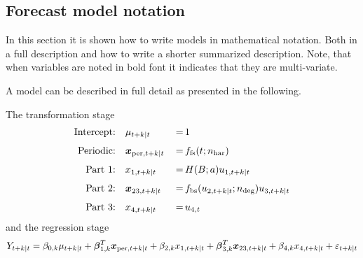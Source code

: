 \begin{appendix}


\section{Forecast model notation}\label{sec:forec-model-notat}
In this section it is shown how to write \onlineforecast models in mathematical
notation. Both in a full description and how to write a shorter summarized
description. Note, that when variables are noted in bold font it indicates that
they are multi-variate.

A model can be described in full detail as presented in the following.

The transformation stage
\begin{alignat}{2}\label{eq:model-full-trans}
  \text{Intercept:}\quad& \mu_{t+k|t} &\,=\,& 1 \\[1ex]
  \text{Periodic:}\quad& \mbox{\boldmath{$x$}}_{\mathrm{per},t+k|t} &\,=\,&  f_{\mathrm{fs}}(t;n_{\mathrm{har}}) \\[1ex]
  \text{Part 1:}\quad& x_{\mathrm{1},t+k|t} &\,=\,& H(B;a) u_{\mathrm{1},t+k|t} \\[1ex]
  \text{Part 2:}\quad& \mbox{\boldmath{$x$}}_{\mathrm{23},t+k|t} &\,=\,&
  f_{\mathrm{bs}}(u_{\mathrm{2},t+k|t};n_{\mathrm{deg}}) u_{\mathrm{3},t+k|t} \\[1ex]
  \text{Part 3:}\quad& x_{\mathrm{4},t+k|t} &\,=\,& u_{\mathrm{4},t}
\end{alignat}
and the regression stage
\begin{align}\label{eq:model-full-reg}
  Y_{t+k|t} = \beta_{0,k} \mu_{t+k|t} + \mbox{\boldmath{$\beta$}}^T_{1,k}
  \mbox{\boldmath{$x$}}_{\mathrm{per},t+k|t} + \beta_{2,k} x_{\mathrm{1},t+k|t} + \mbox{\boldmath{$\beta$}}^T_{3,k}
  \mbox{\boldmath{$x$}}_{\mathrm{23},t+k|t} + \beta_{4,k} x_{\mathrm{4},t+k|t} + \varepsilon_{t+k|t}
\end{align}


\end{appendix}
